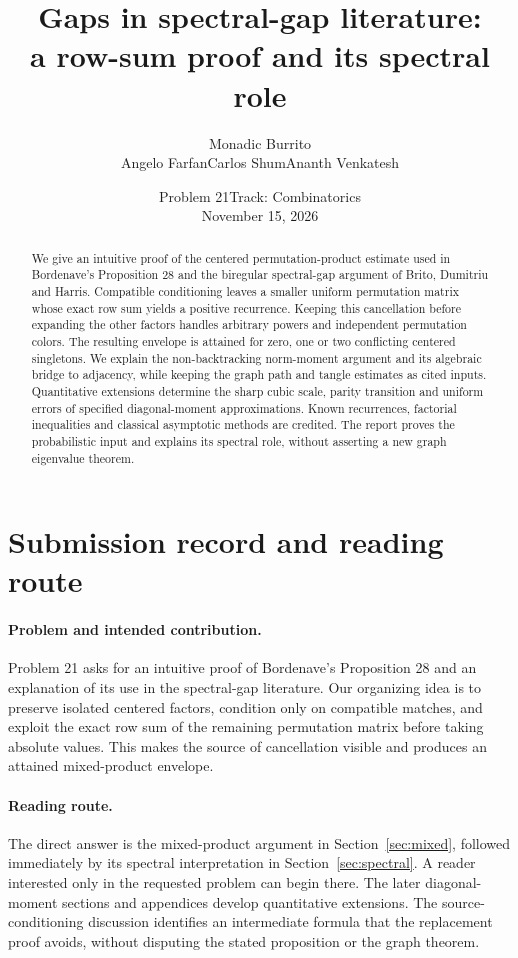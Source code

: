 \documentclass[11pt]{article}
\title{Gaps in spectral-gap literature:\\ a row-sum proof and its spectral role}
\author{Monadic Burrito\\Angelo Farfan\quad Carlos Shum\quad Ananth Venkatesh}
\date{Problem 21\quad Track: Combinatorics\\November 15, 2026}
\theoremstyle{definition}
\theoremstyle{remark}
\newcommand{\1}{\mathbf 1}
\begin{document}
\maketitle
\begin{abstract}
We give an intuitive proof of the centered permutation-product estimate used in Bordenave's Proposition 28 and the biregular spectral-gap argument of Brito, Dumitriu and Harris. Compatible conditioning leaves a smaller uniform permutation matrix whose exact row sum yields a positive recurrence. Keeping this cancellation before expanding the other factors handles arbitrary powers and independent permutation colors. The resulting envelope is attained for zero, one or two conflicting centered singletons. We explain the non-backtracking norm-moment argument and its algebraic bridge to adjacency, while keeping the graph path and tangle estimates as cited inputs. Quantitative extensions determine the sharp cubic scale, parity transition and uniform errors of specified diagonal-moment approximations. Known recurrences, factorial inequalities and classical asymptotic methods are credited. The report proves the probabilistic input and explains its spectral role, without asserting a new graph eigenvalue theorem.
\end{abstract}
\section*{Submission record and reading route}

\paragraph{Problem and intended contribution.}
Problem 21 asks for an intuitive proof of Bordenave's Proposition 28 and an explanation of its use in the spectral-gap literature. Our organizing idea is to preserve isolated centered factors, condition only on compatible matches, and exploit the exact row sum of the remaining permutation matrix before taking absolute values. This makes the source of cancellation visible and produces an attained mixed-product envelope.

\paragraph{Reading route.}
The direct answer is the mixed-product argument in Section~\ref{sec:mixed}, followed immediately by its spectral interpretation in Section~\ref{sec:spectral}. A reader interested only in the requested problem can begin there. The later diagonal-moment sections and appendices develop quantitative extensions. The source-conditioning discussion identifies an intermediate formula that the replacement proof avoids, without disputing the stated proposition or the graph theorem.
\end{document}
